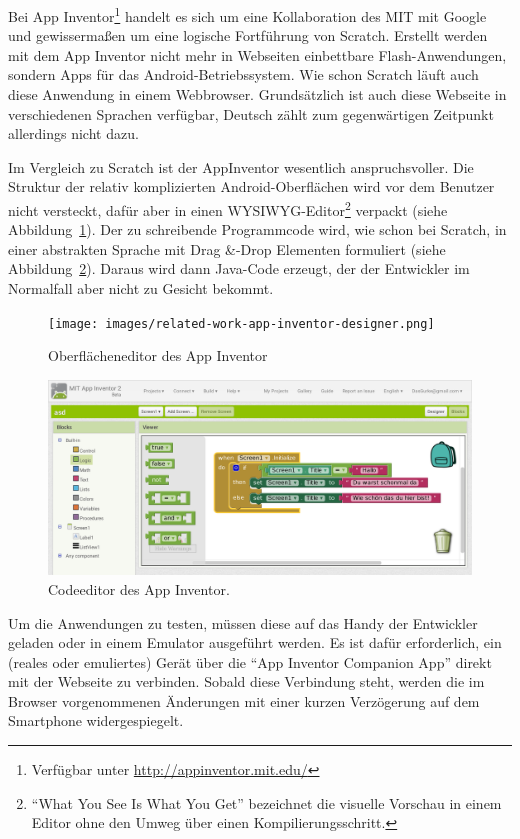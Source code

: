 Bei App Inventor\footnote{Verfügbar unter \url{http://appinventor.mit.edu/}} handelt es sich um eine Kollaboration des MIT mit Google und gewissermaßen um eine logische Fortführung von Scratch. Erstellt werden mit dem App Inventor nicht mehr in Webseiten einbettbare Flash-Anwendungen, sondern Apps für das Android-Betriebssystem. Wie schon Scratch läuft auch diese Anwendung in einem Webbrowser. Grundsätzlich ist auch diese Webseite in verschiedenen Sprachen verfügbar, Deutsch zählt zum gegenwärtigen Zeitpunkt allerdings nicht dazu.

Im Vergleich zu Scratch ist der AppInventor wesentlich anspruchsvoller. Die Struktur der relativ komplizierten Android-Oberflächen wird vor dem Benutzer nicht versteckt, dafür aber in einen WYSIWYG-Editor\footnote{"`What You See Is What You Get"' bezeichnet die visuelle Vorschau in einem Editor ohne den Umweg über einen Kompilierungsschritt.} verpackt (siehe Abbildung~\ref{fig:app-inventor-ui-designer}). Der zu schreibende Programmcode wird, wie schon bei Scratch, in einer abstrakten Sprache mit Drag \&-Drop Elementen formuliert (siehe Abbildung~\ref{fig:app-inventor-block-designer}). Daraus wird dann Java-Code erzeugt, der der Entwickler im Normalfall aber nicht zu Gesicht bekommt.

\begin{figure}[h]
  \centering \texttt{[image: images/related-work-app-inventor-designer.png]}
  \caption{Oberflächeneditor des App Inventor}
  \label{fig:app-inventor-ui-designer}
\end{figure}

\begin{figure}[h]
  \centering \includegraphics[width=\textwidth]{images/related-work-app-inventor-blocks.png}
  \caption{Codeeditor des App Inventor.}
  \label{fig:app-inventor-block-designer}
\end{figure}

Um die Anwendungen zu testen, müssen diese auf das Handy der Entwickler geladen oder in einem Emulator ausgeführt werden. Es ist dafür erforderlich, ein (reales oder emuliertes) Gerät über die "`App Inventor Companion App"' direkt mit der Webseite zu verbinden. Sobald diese Verbindung steht, werden die im Browser vorgenommenen Änderungen mit einer kurzen Verzögerung auf dem Smartphone widergespiegelt.


